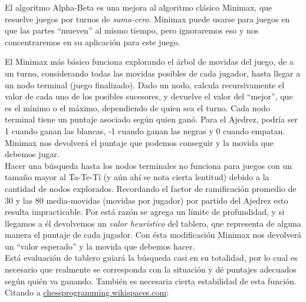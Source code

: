 \documentclass{article}
\begin{document}
El algoritmo Alpha-Beta es una mejora al algoritmo clásico Minimax, que
resuelve juegos por turnos de \emph{suma-cero}\footnotemark . Minimax
puede usarse para juegos en que las partes ``mueven'' al mismo tiempo,
pero ignoraremos eso y nos concentraremos en su aplicación para este
juego.
\\


El Minimax más básico funciona explorando el árbol de movidas del
juego, de a un turno, considerando todas las movidas posibles de cada
jugador, hasta llegar a un nodo terminal (juego finalizado). Dado un
nodo, calcula recursivamente el valor de cada uno de los posibles
sucesores, y devuelve el valor del ``mejor'', que es el mínimo o el
máximo, dependiendo de quien sea el turno. Cada nodo terminal tiene
un puntaje asociado según quien ganó. Para el Ajedrez, podría ser 1
cuando ganan las blancas, -1 cuando ganan las negras y 0 cuando empatan.
Minimax nos devolverá el puntaje que podemos conseguir y la movida que
debemos jugar.
\\

Hacer una búsqueda hasta los nodos terminales no funciona para juegos
con un tamaño mayor al Ta-Te-Tí (y aún ahí se nota cierta lentitud)
debido a la cantidad de nodos explorados. Recordando el factor de
ramificación promedio de 30 y las 80 media-movidas (movidas por
jugador) por partido del Ajedrez esto resulta impracticable. Por
está razón se agrega un límite de profundidad, y si llegamos a él
devolvemos un \emph{valor heurístico} del tablero, que representa
de alguna manera el puntaje de cada jugador. Con ésta modificación
Minimax nos devolverá un ``valor esperado'' y la movida que debemos
hacer.
\\

Está evaluación de tablero guiará la búsqueda casi en su
totalidad, por lo cual es necesario que realmente se corresponda con
la situación y dé puntajes adecuados según quién va ganando.
También es necesaria cierta estabilidad de esta función. Citando a
\href{http://chessprogramming.wikispaces.com/}{chessprogramming.wikispaces.com}:
\\

\noindent
{}
\\
\end{document}
